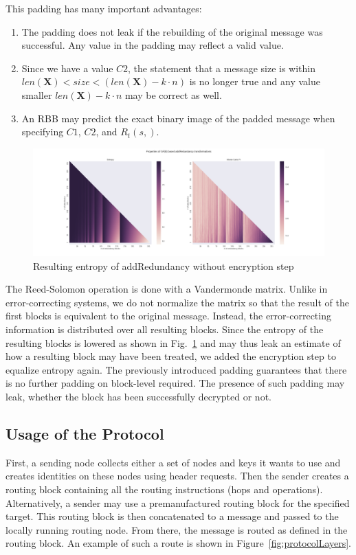 \documentclass[acmsmall, screen]{acmart}
\begin{document}
This padding has many important advantages:
\begin{enumerate}
	\item The padding does not leak if the rebuilding of the original message was successful. Any value in the padding may reflect a valid value.
	\item Since we have a value $C2$, the statement that a message size is within $len(\mathbf{X})<size<(len(\mathbf{X})-k\cdot n)$ is no longer true and any value smaller $len(\mathbf{X})-k\cdot n$ may be correct as well.
	\item An RBB may predict the exact binary image of the padded message when specifying $C1$, $C2$, and $R_{t}(s,)$.
\end{enumerate}

\begin{figure}[ht]\centering
	\includegraphics[width=1\columnwidth]{randomblock_10kb}
	\caption{Resulting entropy of addRedundancy without encryption step}
	\label{fig:entropy}
\end{figure}


The Reed-Solomon operation is done with a Vandermonde matrix. Unlike in error-correcting systems, we do not normalize the matrix so that the result of the first blocks is equivalent to the original message. Instead, the error-correcting information is distributed over all resulting blocks. Since the entropy of the resulting blocks is lowered as shown in Fig.~\ref{fig:entropy} and may thus leak an estimate of how a resulting block may have been treated, we added the encryption step to equalize entropy again. The previously introduced padding guarantees that there is no further padding on block-level required. The presence of such padding may leak, whether the block has been successfully decrypted or not.

\subsection{Usage of the Protocol}
First, a sending node collects either a set of nodes and keys it wants to use and creates identities on these nodes using header requests. Then the sender creates a routing block containing all the routing instructions (hops and operations). Alternatively, a sender may use a premanufactured routing block for the specified target. This routing block is then concatenated to a message and passed to the locally running routing node. From there, the message is routed as defined in the routing block. An example of such a route is shown in Figure~\ref{fig:protocolLayers}.
\end{document}
